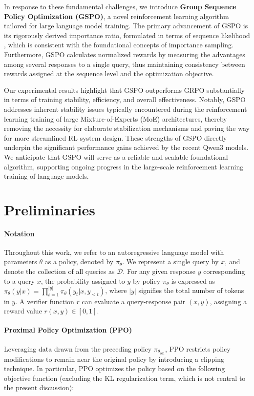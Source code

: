 In response to these fundamental challenges, we introduce \textbf{Group Sequence Policy Optimization (GSPO)}, a novel reinforcement learning algorithm tailored for large language model training. The primary advancement of GSPO is its rigorously derived importance ratio, formulated in terms of sequence likelihood \citep{click}, which is consistent with the foundational concepts of importance sampling. Furthermore, GSPO calculates normalized rewards by measuring the advantages among several responses to a single query, thus maintaining consistency between rewards assigned at the sequence level and the optimization objective.

Our experimental results highlight that GSPO outperforms GRPO substantially in terms of training stability, efficiency, and overall effectiveness. Notably, GSPO addresses inherent stability issues typically encountered during the reinforcement learning training of large Mixture-of-Experts (MoE) architectures, thereby removing the necessity for elaborate stabilization mechanisms and paving the way for more streamlined RL system design. These strengths of GSPO directly underpin the significant performance gains achieved by the recent Qwen3 models. We anticipate that GSPO will serve as a reliable and scalable foundational algorithm, supporting ongoing progress in the large-scale reinforcement learning training of language models.

\section{Preliminaries}

\paragraph{Notation}
Throughout this work, we refer to an autoregressive language model with parameters $\theta$ as a policy, denoted by $\pi_\theta$. We represent a single query by $x$, and denote the collection of all queries as $\mathcal{D}$. For any given response $y$ corresponding to a query $x$, the probability assigned to $y$ by policy $\pi_\theta$ is expressed as $\pi_\theta (y | x)=\prod_{t=1}^{|y|} \pi_\theta (y_t | x, y_{<t} )$, where $|y|$ signifies the total number of tokens in $y$. A verifier function $r$ can evaluate a query-response pair $(x, y)$, assigning a reward value $r(x, y) \in [0, 1]$.

\paragraph{Proximal Policy Optimization (PPO)} Leveraging data drawn from the preceding policy $\pi_{\theta_\text{old}}$, PPO \citep{ppo} restricts policy modifications to remain near the original policy by introducing a clipping technique. In particular, PPO optimizes the policy based on the following objective function (excluding the KL regularization term, which is not central to the present discussion):

